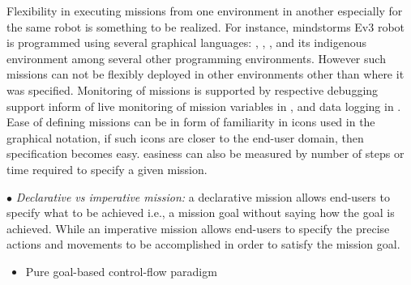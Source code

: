 Flexibility in executing missions from one environment in another especially for the same robot is something to be realized. For instance, mindstorms Ev3 robot is programmed using several graphical languages: \trik, \openroberta, \robotc, \scratchev and its indigenous environment \lego among several other programming environments. However such missions can not be flexibly deployed in other environments other than where it was specified. Monitoring of missions is supported by respective debugging support inform of live monitoring of mission variables in \edison, \aseba and data logging in \codelab. Ease of defining missions can be in form of familiarity in icons used in the graphical notation, if such icons are closer to the end-user domain, then specification becomes easy. easiness can also be measured by number of steps or time required to specify a given mission.


$\bullet$ \emph{Declarative vs imperative mission:} a declarative mission allows end-users to specify what to be achieved i.e., a mission goal without saying how the goal is achieved. While an  imperative mission allows end-users to specify the precise actions and movements to be accomplished in order to satisfy the mission goal. %

\begin{itemize}
	\item Pure goal-based control-flow paradigm 
\end{itemize}
